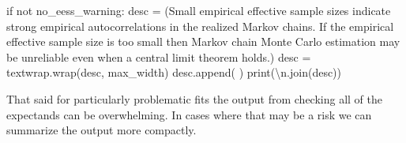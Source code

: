 \documentclass[
  letterpaper,
  DIV=11,
  numbers=noendperiod]{scrartcl}
\newenvironment{Shaded}{\begin{snugshade}}{\end{snugshade}}
\newcommand{\BuiltInTok}[1]{\textcolor[rgb]{0.00,0.23,0.31}{#1}}
\newcommand{\CharTok}[1]{\textcolor[rgb]{0.13,0.47,0.30}{#1}}
\newcommand{\ControlFlowTok}[1]{\textcolor[rgb]{0.00,0.23,0.31}{#1}}
\newcommand{\KeywordTok}[1]{\textcolor[rgb]{0.00,0.23,0.31}{#1}}
\newcommand{\NormalTok}[1]{\textcolor[rgb]{0.00,0.23,0.31}{#1}}
\newcommand{\OperatorTok}[1]{\textcolor[rgb]{0.37,0.37,0.37}{#1}}
\newcommand{\StringTok}[1]{\textcolor[rgb]{0.13,0.47,0.30}{#1}}
\begin{document}
\begin{Shaded}
\begin{Highlighting}[]
  \ControlFlowTok{if} \KeywordTok{not}\NormalTok{ no\_eess\_warning:}
\NormalTok{    desc }\OperatorTok{=}\NormalTok{ (}\StringTok{\textquotesingle{}Small empirical effective sample sizes indicate strong \textquotesingle{}}
            \StringTok{\textquotesingle{}empirical autocorrelations in the realized Markov chains. \textquotesingle{}}
            \StringTok{\textquotesingle{}If the empirical effective sample size is too \textquotesingle{}}
            \StringTok{\textquotesingle{}small then Markov chain Monte Carlo estimation \textquotesingle{}}
            \StringTok{\textquotesingle{}may be unreliable even when a central limit \textquotesingle{}}
            \StringTok{\textquotesingle{}theorem holds.\textquotesingle{}}\NormalTok{)}
\NormalTok{    desc }\OperatorTok{=}\NormalTok{ textwrap.wrap(desc, max\_width)}
\NormalTok{    desc.append(}\StringTok{\textquotesingle{} \textquotesingle{}}\NormalTok{)}
    \BuiltInTok{print}\NormalTok{(}\StringTok{\textquotesingle{}}\CharTok{\textbackslash{}n}\StringTok{\textquotesingle{}}\NormalTok{.join(desc))}
    
\end{Highlighting}
\end{Shaded}

That said for particularly problematic fits the output from checking all
of the expectands can be overwhelming. In cases where that may be a risk
we can summarize the output more compactly.
\end{document}
